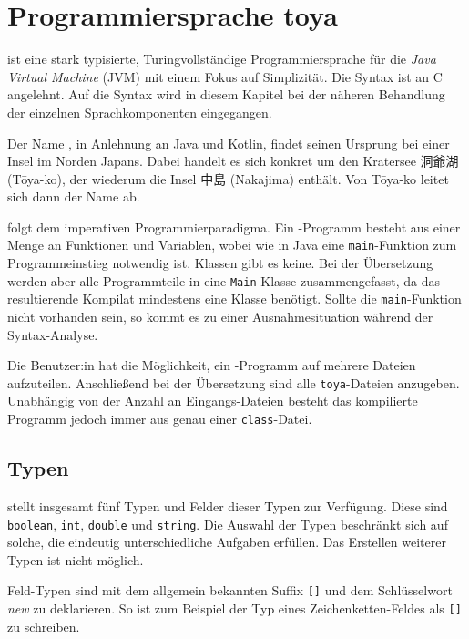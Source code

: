 \chapter{Programmiersprache toya}
\label{cha:toya}

\Toya ist eine stark typisierte, Turing\-vollständige Programmiersprache für die \textit{Java Virtual Machine} (JVM) mit einem Fokus auf Simplizität. Die Syntax ist an C angelehnt. Auf die Syntax wird in diesem Kapitel bei der näheren Behandlung der einzelnen Sprachkomponenten eingegangen. 

\begin{CJK}{UTF8}{ipxm}
Der Name \toya, in Anlehnung an Java und Kotlin, findet seinen Ursprung bei einer Insel im Norden Japans. Dabei handelt es sich konkret um den Kratersee 洞爺湖 (Tōya-ko), der wiederum die Insel 中島 (Nakajima) enthält. Von Tōya-ko leitet sich dann der Name \toya ab.
\end{CJK}

\Toya folgt dem imperativen Programmierparadigma. Ein \toya-Programm besteht aus einer Menge an Funktionen und Variablen, wobei wie in Java eine \texttt{main}-Funktion zum Programmeinstieg notwendig ist. Klassen gibt es keine. Bei der Übersetzung werden aber alle Programmteile in eine \texttt{Main}-Klasse zusammengefasst, da das resultierende Kompilat mindestens eine Klasse benötigt. Sollte die \texttt{main}-Funktion nicht vorhanden sein, so kommt es zu einer Ausnahmesituation während der Syntax-Analyse.

Die Benutzer:in hat die Möglichkeit, ein \toya-Programm auf mehrere Dateien aufzuteilen. Anschließend bei der Übersetzung sind alle \texttt{toya}-Dateien anzugeben. Unabhängig von der Anzahl an Eingangs-Dateien besteht das kompilierte Programm jedoch immer aus genau einer \texttt{class}-Datei.  

\section{Typen}

\Toya stellt insgesamt fünf Typen und Felder dieser Typen zur Verfügung. Diese sind \texttt{boolean}, \texttt{int}, \texttt{double} und \texttt{string}. Die Auswahl der Typen beschränkt sich auf solche, die eindeutig unterschiedliche Aufgaben erfüllen. Das Erstellen weiterer Typen ist nicht möglich.

Feld-Typen sind mit dem allgemein bekannten Suffix \texttt{[]} und dem Schlüsselwort \textit{new} zu deklarieren. So ist zum Beispiel der Typ eines Zeichenketten-Feldes als \texttt{[]} zu schreiben.

